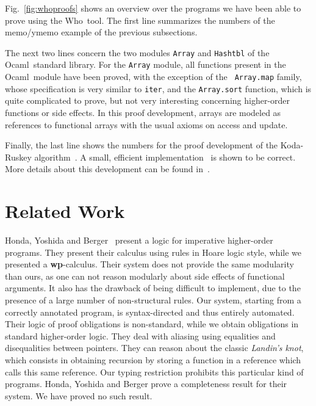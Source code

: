 \documentclass[a4paper]{llncs}
\newcommand{\wpre}{{\bf wp}}
\newcommand{\who}{Who}
\newcommand{\ocaml}{Ocaml}
\begin{document}
Fig.~\ref{fig:whoproofs} shows an overview over the programs we have been able
to prove using the \who\ tool. The first line summarizes the numbers of the
memo/ymemo example of the previous subsections. 

The next two lines concern the two modules {\tt Array} and {\tt Hashtbl} of
the \ocaml\ standard library. For the {\tt Array} module, all functions
present in the \ocaml\ module have been proved, with the exception of the {\tt
Array.map} family, whose specification is very similar to {\tt iter}, and the
{\tt Array.sort} function, which is quite complicated to prove, but not very
interesting concerning higher-order functions or side effects. In this proof
development, arrays are modeled as references to functional arrays with the
usual axioms on access and update.


Finally, the last line shows the numbers for the proof development of the
Koda-Ruskey algorithm~\cite{KodaRuskey93}. A small, efficient
implementation~\cite{FilliatrePottier02} is shown to be correct. More details
about this development can be found in~\cite{KanigFilliatre09wml}.

\section{Related Work}
\label{sec:related}

Honda, Yoshida and
Berger~\cite{Honda05anobservationally,BergerHondaYoshida05aliasing} present a
logic for imperative higher-order programs. They present their calculus using
rules in Hoare logic style, while we presented a \wpre-calculus. Their system
does not provide the same modularity than ours, as one can not reason
modularly about side effects of functional arguments. It also has the drawback
of being difficult to implement, due to the presence of a large number of
non-structural rules. Our system, starting from a correctly annotated program,
is syntax-directed and thus entirely automated. Their logic of proof
obligations is non-standard, while we obtain obligations in standard
higher-order logic. They deal with aliasing using equalities and disequalities
between pointers.  They can reason about the classic {\em Landin's knot},
which consists in obtaining recursion by storing a function in a reference
which calls this same reference. Our typing restriction prohibits this
particular kind of programs.  Honda, Yoshida and Berger prove a completeness
result for their system. We have proved no such result.
\end{document}
